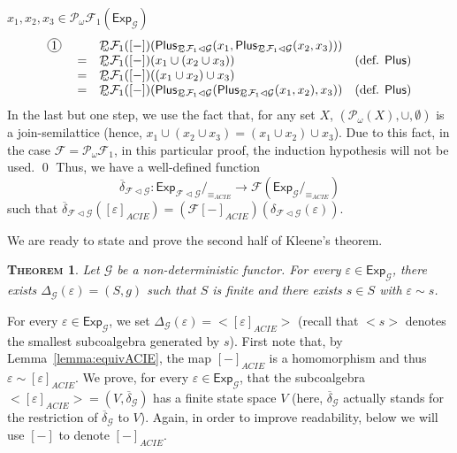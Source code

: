 \documentclass{LMCS}
\def\pow{{\mathcal P_{\!\!\!\omega}}}
\newcommand\E\varepsilon
\newcommand\Exp{\mathsf{Exp}}
\newcommand\Plus{\mathsf{Plus}}
\newcommand\G{\mathcal{G}}
\newcommand\F{\mathcal{F}}
\def\hyph{-\penalty0\hskip0pt\relax}
\theoremstyle{definition}
\theoremstyle{plain}
\theoremstyle{plain}
\newtheorem{mytheorem}[mydefinition]{\textsc{Theorem}}
\theoremstyle{plain}
\theoremstyle{plain}
\theoremstyle{definition}
\theoremstyle{definition}
\newenvironment{theorem}{
\begin{mytheorem}}
    {\end{mytheorem}}
\newcommand*\mycirc[1]{\begin{tikzpicture}[baseline=(C.base)]
    \node[draw,circle,inner sep=1pt](C) {#1};
  \end{tikzpicture}}
\begin{document}
\noindent\fbox{$\F=\pow \F_1$}  $x_1, x_2, x_3 \in \pow \F_1(\Exp_{\G})$
$$\begin{array}{p{.5cm}cll}
\mycirc{1}&&\pow \F_1 ([-])(\Plus_{\pow \F_1\lhd \G}(x_1,\Plus_{\pow \F_1\lhd
\G}(x_2,x_3)))\\
&=& \pow \F_1 ([-])(x_1\cup(x_2\cup x_3))&\text{(def. $\Plus$)}\\
&=& \pow \F_1 ([-])((x_1\cup x_2)\cup x_3)&\\
&=& \pow \F_1 ([-])(\Plus_{\pow \F_1\lhd \G}(\Plus_{\pow \F_1\lhd
\G}(x_1,x_2),x_3))&\text{(def. $\Plus$)}\\
\end{array}
$$
In the last but one step, we use the fact
that, for any set $X$, $(\pow(X), \cup, \emptyset)$ is a join\hyph semilattice
(hence, $x_1\cup(x_2\cup x_3)=(x_1\cup x_2)\cup x_3$). Due to this
fact, in the case $\F=\pow \F_1$, in this particular proof, the
induction hypothesis will not be
used.
\qed
Thus, we have a well-defined function $$\overline{\delta}_{\F\lhd
\G}\colon\Exp_{\F\lhd \G}/_{\equiv_{\mathit{ACIE}}}\to \F(
\Exp_\G/_{\equiv_{\mathit{ACIE}}})$$ such that $\overline{\delta}_{\F\lhd
\G} ([\E]_{\mathit{ACIE}}) = (\F [-]_{\mathit{ACIE}})({\delta}_{\F\lhd
\G} (\E))$. 

We are ready to state and prove the second half of Kleene's theorem. 

\begin{theorem}\label{kleene2}
Let $\G$ be a non\hyph deterministic functor. For every $\E\in \Exp_\G$,
there exists $\Delta_\G(\E)=(S,g)$ such that $S$ is finite and there exists $s\in
S$ with $\E\sim s$.
\end{theorem}
\proof 
For every $\E\in  \Exp_\G$, we set $\Delta_\G(\E) =
<[\E]_{\mathit{ACIE}}>$ (recall that $<s>$ denotes the smallest subcoalgebra
generated by $s$). First note that, by
Lemma~\ref{lemma:equivACIE}, the map $[-]_\mathit{ACIE}$ is a
homomorphism and thus $\E\sim [\E]_\mathit{ACIE}$. We prove, for every
$\E\in  \Exp_\G$, that the subcoalgebra $<[\E]_{\mathit{ACIE}}> =
(V, \overline\delta_{\G})$  has a finite state space $V$ (here, $ \overline\delta_\G$
actually stands for the restriction of $ \overline\delta_\G$ to $V$).
Again, in order to improve readability, below we will use $[-]$ to denote $[-]_{\mathit{ACIE}}$.  
\end{document}
